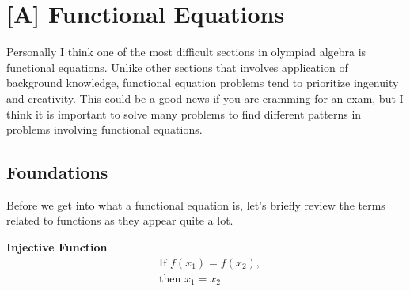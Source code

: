 \documentclass[../../main.tex]{subfiles}
\begin{document}
\chapter{[A] Functional Equations}

Personally I think one of the most difficult sections in olympiad
algebra is functional equations. Unlike other sections that involves
application of background knowledge, functional equation problems
tend to prioritize ingenuity and creativity. This could be a
good news if you are cramming for an exam, but I think it is
important to solve many problems to find different patterns in
problems involving functional equations.

\section{Foundations}

Before we get into what a functional equation is, let's briefly
review the terms related to functions as they appear quite a lot.

\begin{minipage}{0.48\textwidth}
\begin{center}
\textbf{Injective Function}
\begin{align*}
    &\text{If } f(x_1) = f(x_2), \\
    &\text{then } x_1 = x_2
\end{align*}
\end{center}
\end{minipage}
\hfill
\begin{minipage}{0.48\textwidth}
\begin{center}
\end{center}
\end{minipage}
\end{document}
